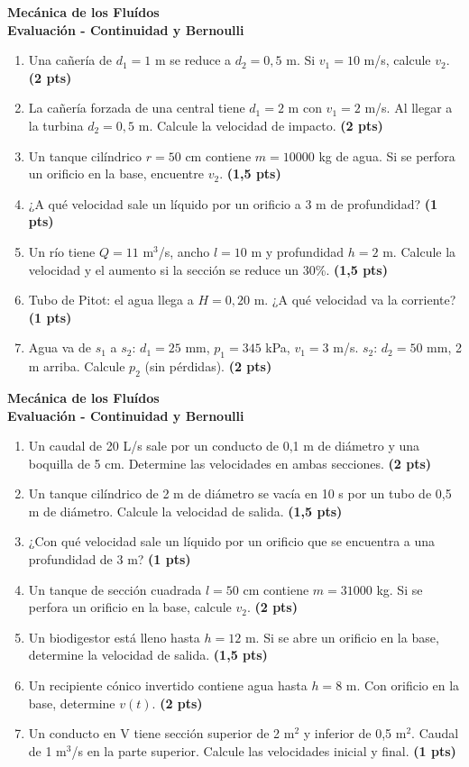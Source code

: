\documentclass[a4paper,11pt]{article}
\newcommand{\prob}[2]{\item #1 \textbf{(#2 pts)}}
\begin{document}
\noindent
\begin{minipage}[t][0.47\textheight][t]{0.48\textwidth}
  \begin{center}
    \textbf{\large Mecánica de los Fluídos}\\
    \textbf{\Large Evaluación - Continuidad y Bernoulli}
  \end{center}
  \begin{enumerate}
    \prob{Una cañería de $d_1=1$ m se reduce a $d_2=0,5$ m. Si $v_1=10$ m/s, calcule $v_2$.}{2}
    \prob{La cañería forzada de una central tiene $d_1=2$ m con $v_1=2$ m/s. Al llegar a la turbina $d_2=0,5$ m. Calcule la velocidad de impacto.}{2}
    \prob{Un tanque cilíndrico $r=50$ cm contiene $m=10000$ kg de agua. Si se perfora un orificio en la base, encuentre $v_2$.}{1,5}
    \prob{¿A qué velocidad sale un líquido por un orificio a 3 m de profundidad?}{1}
    \prob{Un río tiene $Q=11$ m$^3$/s, ancho $l=10$ m y profundidad $h=2$ m. Calcule la velocidad y el aumento si la sección se reduce un 30\%.}{1,5}
    \prob{Tubo de Pitot: el agua llega a $H=0,20$ m. ¿A qué velocidad va la corriente?}{1}
    \prob{Agua va de $s_1$ a $s_2$: $d_1=25$ mm, $p_1=345$ kPa, $v_1=3$ m/s. $s_2$: $d_2=50$ mm, 2 m arriba. Calcule $p_2$ (sin pérdidas).}{2}
  \end{enumerate}
\end{minipage}
\hfill
\begin{minipage}[t][0.47\textheight][t]{0.48\textwidth}
  \begin{center}
    \textbf{\large Mecánica de los Fluídos}\\
    \textbf{\Large Evaluación - Continuidad y Bernoulli}
  \end{center}
  \begin{enumerate}
    \prob{Un caudal de 20 L/s sale por un conducto de 0,1 m de diámetro y una boquilla de 5 cm. Determine las velocidades en ambas secciones.}{2}
    \prob{Un tanque cilíndrico de 2 m de diámetro se vacía en 10 s por un tubo de 0,5 m de diámetro. Calcule la velocidad de salida.}{1,5}
    \prob{¿Con qué velocidad sale un líquido por un orificio que se encuentra a una profundidad de 3 m?}{1}
    \prob{Un tanque de sección cuadrada $l=50$ cm contiene $m=31000$ kg. Si se perfora un orificio en la base, calcule $v_2$.}{2}
    \prob{Un biodigestor está lleno hasta $h=12$ m. Si se abre un orificio en la base, determine la velocidad de salida.}{1,5}
    \prob{Un recipiente cónico invertido contiene agua hasta $h=8$ m. Con orificio en la base, determine $v(t)$.}{2}
    \prob{Un conducto en V tiene sección superior de 2 m$^2$ y inferior de 0,5 m$^2$. Caudal de 1 m$^3$/s en la parte superior. Calcule las velocidades inicial y final.}{1}
  \end{enumerate}
\end{minipage}
\end{document}
